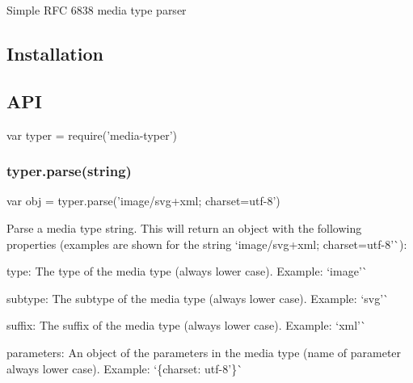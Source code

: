 \href{https://npmjs.org/package/media-typer}{\tt } \href{https://npmjs.org/package/media-typer}{\tt } \href{http://nodejs.org/download/}{\tt } \href{https://travis-ci.org/jshttp/media-typer}{\tt } \href{https://coveralls.io/r/jshttp/media-typer}{\tt }

Simple R\+FC 6838 media type parser

\subsection*{Installation}




\subsection*{A\+PI}


\begin{DoxyCode}
var typer = require('media-typer')
\end{DoxyCode}


\subsubsection*{typer.\+parse(string)}


\begin{DoxyCode}
var obj = typer.parse('image/svg+xml; charset=utf-8')
\end{DoxyCode}


Parse a media type string. This will return an object with the following properties (examples are shown for the string `\textquotesingle{}image/svg+xml; charset=utf-\/8'\`{})\+:


\begin{DoxyItemize}
\item {\ttfamily type}\+: The type of the media type (always lower case). Example\+: `\textquotesingle{}image'\`{}
\item {\ttfamily subtype}\+: The subtype of the media type (always lower case). Example\+: `\textquotesingle{}svg'\`{}
\item {\ttfamily suffix}\+: The suffix of the media type (always lower case). Example\+: `\textquotesingle{}xml'\`{}
\item {\ttfamily parameters}\+: An object of the parameters in the media type (name of parameter always lower case). Example\+: `\{charset\+: \textquotesingle{}utf-\/8'\}\`{}
\end{DoxyItemize}


